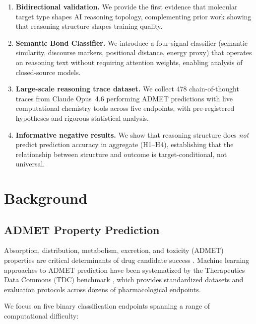 \documentclass[11pt]{article}
\begin{document}
\begin{enumerate}[leftmargin=*]
    \item \textbf{Bidirectional validation.} We provide the first evidence that molecular target type shapes AI reasoning topology, complementing prior work showing that reasoning structure shapes training quality.

    \item \textbf{Semantic Bond Classifier.} We introduce a four-signal classifier (semantic similarity, discourse markers, positional distance, energy proxy) that operates on reasoning text without requiring attention weights, enabling analysis of closed-source models.

    \item \textbf{Large-scale reasoning trace dataset.} We collect 478 chain-of-thought traces from Claude Opus~4.6 performing ADMET predictions with live computational chemistry tools across five endpoints, with pre-registered hypotheses and rigorous statistical analysis.

    \item \textbf{Informative negative results.} We show that reasoning structure does \emph{not} predict prediction accuracy in aggregate (H1--H4), establishing that the relationship between structure and outcome is target-conditional, not universal.
\end{enumerate}

\section{Background}
\label{sec:background}

\subsection{ADMET Property Prediction}

Absorption, distribution, metabolism, excretion, and toxicity (ADMET) properties are critical determinants of drug candidate success \citep{kola2004can, ferreira2019admet}. Machine learning approaches to ADMET prediction have been systematized by the Therapeutics Data Commons (TDC) benchmark \citep{huang2021therapeutics}, which provides standardized datasets and evaluation protocols across dozens of pharmacological endpoints.

We focus on five binary classification endpoints spanning a range of computational difficulty:
\end{document}
